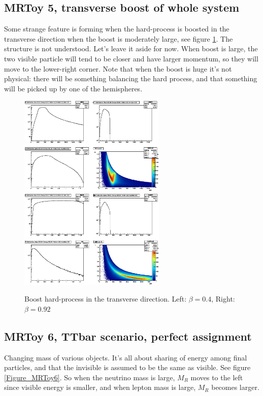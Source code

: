 \documentclass{fheadnote}
\begin{document}
\subsection{MRToy 5, transverse boost of whole system}

Some strange feature is forming when the hard-process is boosted in the transverse direction when the boost is moderately large, see figure \ref{Figure_MRToy5}.
The structure is not understood.  Let's leave it aside for now.
When boost is large, the two visible particle will tend to be closer and have larger momentum, so they will move to the lower-right corner.
Note that when the boost is huge it's not physical: there will be something balancing the hard process, and that something will be picked up by one of the hemispheres.

\begin{figure}[htbp]
   \centering
   \includegraphics[width=7cm]{Figures/MRToy5_ModerateBoost}
   \includegraphics[width=7cm]{Figures/MRToy5_LargeBoost}
   \caption{Boost hard-process in the transverse direction.  Left: $\beta = 0.4$, Right: $\beta = 0.92$}
   \label{Figure_MRToy5}
\end{figure}

\subsection{MRToy 6, TTbar scenario, perfect assignment}

Changing mass of various objects.  It's all about sharing of energy among final particles, and that the invisible is assumed to be the same as visible.  See figure \ref{Figure_MRToy6}.
So when the neutrino mass is large, $M_R$ moves to the left since visible energy is smaller, and when lepton mass is large, $M_R$ becomes larger.
\end{document}

